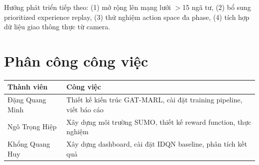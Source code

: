 \documentclass[conference]{IEEEtran}
\begin{document}
Hướng phát triển tiếp theo: (1) mở rộng lên mạng lưới $>$15 ngã tư, (2) bổ sung prioritized experience replay, (3) thử nghiệm action space đa phase, (4) tích hợp dữ liệu giao thông thực từ camera.

\section*{Phân công công việc}

\begin{table}[!h]
\centering
\small
\begin{tabular}{p{2.8cm} p{5cm}}
\toprule
\textbf{Thành viên} & \textbf{Công việc} \\
\midrule
Đặng Quang Minh
&
Thiết kế kiến trúc GAT-MARL, cài đặt training pipeline, viết báo cáo \\[0.8em]

Ngô Trọng Hiệp
&
Xây dựng môi trường SUMO, thiết kế reward function, thực nghiệm \\[0.8em]

Khổng Quang Huy
&
Xây dựng dashboard, cài đặt IDQN baseline, phân tích kết quả \\
\bottomrule
\end{tabular}
\end{table}
\end{document}
